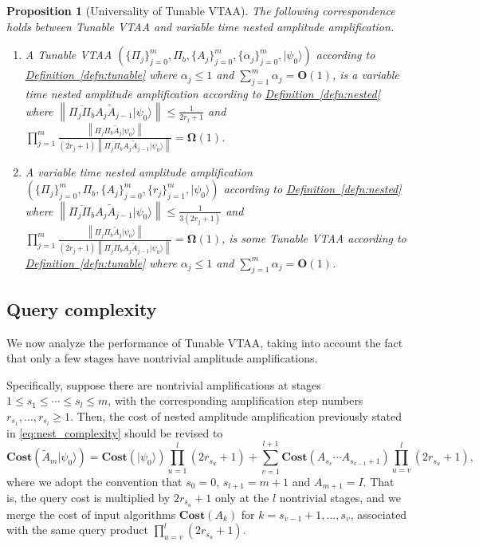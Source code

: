 \documentclass[letterpaper,onecolumn,11pt,accepted=2026-02-14]{quantumarticle}
\newcommand{\norm}[1]{\left\lVert#1\right\rVert}
\newtheorem{proposition}[lemma]{Proposition}
\theoremstyle{remark}
\theoremstyle{plain}
\newcommand{\eq}[1]{\cref{eq:#1}}
\newcommand{\defn}[1]{\hyperref[defn:#1]{Definition~\ref*{defn:#1}}}
\newcommand{\ket}[1]{|#1\rangle}
\begin{document}
\begin{proposition}[Universality of Tunable VTAA]
\label{prop:tunable_universal}
The following correspondence holds between Tunable VTAA and variable time nested amplitude amplification.
\begin{enumerate}[label=(\roman*)]
\item A Tunable VTAA $\left(\{\Pi_j\}_{j=0}^m,\Pi_b,\{A_j\}_{j=0}^m,\{\alpha_j\}_{j=0}^m,\ket{\psi_0}\right)$ according to \defn{tunable} where $\alpha_j\leq1$ and $\sum_{j=1}^m\alpha_j=\mathbf{O}(1)$, is a variable time nested amplitude amplification according to \defn{nested} where  $\norm{\overline{\Pi_j\Pi_b}A_j\widetilde A_{j-1}\ket{\psi_0}}\leq\frac{1}{2r_j+1}$ and $\prod_{j=1}^m\frac{\norm{\overline{\Pi_j\Pi_b}\widetilde A_j\ket{\psi_0}}}{(2r_j+1)\norm{\overline{\Pi_j\Pi_b}A_j\widetilde A_{j-1}\ket{\psi_0}}}=\mathbf{\Omega}(1)$.
\item A variable time nested amplitude amplification $\left(\{\Pi_j\}_{j=0}^m,\Pi_b,\{A_j\}_{j=0}^m,\{r_j\}_{j=1}^m,\ket{\psi_0}\right)$ according to \defn{nested} where $\norm{\overline{\Pi_j\Pi_b}A_j\widetilde A_{j-1}\ket{\psi_0}}\leq\frac{1}{3(2r_j+1)}$ and  $\prod_{j=1}^m\frac{\norm{\overline{\Pi_j\Pi_b}\widetilde A_j\ket{\psi_0}}}{(2r_j+1)\norm{\overline{\Pi_j\Pi_b}A_j\widetilde A_{j-1}\ket{\psi_0}}}=\mathbf{\Omega}(1)$, is some Tunable VTAA according to \defn{tunable} where $\alpha_j\leq1$ and $\sum_{j=1}^m\alpha_j=\mathbf{O}(1)$.
\end{enumerate}
\end{proposition}

\subsection{Query complexity}
\label{sec:tunable_query}
We now analyze the performance of Tunable VTAA, taking into account the fact that only a few stages have nontrivial amplitude amplifications. 

Specifically, suppose there are nontrivial amplifications at stages $1\leq s_1\leq\cdots\leq s_{l}\leq m$, with the corresponding amplification step numbers $r_{s_1},\ldots,r_{s_{l}}\geq 1$. Then, the cost of nested amplitude amplification previously stated in \eq{nest_complexity} should be revised to
\begin{equation}
\label{eq:tunable_complexity}
    \mathbf{Cost}(\widetilde A_m\ket{\psi_0})
    =\mathbf{Cost}(\ket{\psi_0})\prod_{u=1}^{l}(2r_{s_u}+1)
    +\sum_{v=1}^{l+1}\mathbf{Cost}(A_{s_v}\cdots A_{s_{v-1}+1})\prod_{u=v}^{l}(2r_{s_u}+1),
\end{equation}
where we adopt the convention that $s_0=0$, $s_{l+1}=m+1$ and $A_{m+1}=I$. That is, the query cost is multiplied by $2r_{s_u}+1$ only at the $l$ nontrivial stages, and we merge the cost of input algorithms $\mathbf{Cost}(A_{k})$ for $k=s_{v-1}+1,\ldots,s_v$, associated with the same query product $\prod_{u=v}^{l}(2r_{s_u}+1)$.
\end{document}
